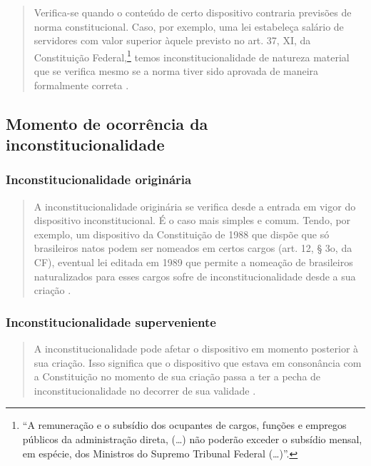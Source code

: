 \documentclass{article}
\begin{document}
\begin{quote}
    Verifica-se quando o conteúdo de certo dispositivo contraria previsões de norma constitucional. Caso, por exemplo, uma lei estabeleça salário de servidores com valor superior àquele previsto no art. 37, XI, da Constituição Federal,\footnote{“A remuneração e o subsídio dos ocupantes de cargos, funções e empregos públicos da administração direta, (…) não poderão exceder o subsídio mensal, em espécie, dos Ministros do Supremo Tribunal Federal (…)”.} temos inconstitucionalidade de natureza material que se verifica mesmo se a norma tiver sido aprovada de maneira formalmente correta \cite[pp. 96-97]{dimoulis_curso_2016}.
\end{quote}

\subsection{Momento de ocorrência da inconstitucionalidade}

\subsubsection{Inconstitucionalidade originária}

\begin{quote}
    A inconstitucionalidade originária se verifica desde a entrada em vigor do dispositivo inconstitucional. É o caso mais simples e comum. Tendo, por exemplo, um dispositivo da Constituição de 1988 que dispõe que só brasileiros natos podem ser nomeados em certos cargos (art. 12, § 3o, da CF), eventual lei editada em 1989 que permite a nomeação de brasileiros naturalizados para esses cargos sofre de inconstitucionalidade desde a sua criação \cite[p. 97]{dimoulis_curso_2016}.
\end{quote}

\subsubsection{Inconstitucionalidade superveniente}

\begin{quote}
    A inconstitucionalidade pode afetar o dispositivo em momento posterior à sua criação. Isso significa que o dispositivo que estava em consonância com a Constituição no momento de sua criação passa a ter a pecha de inconstitucionalidade no decorrer de sua validade \cite[p. 97]{dimoulis_curso_2016}.
\end{quote}
\end{document}
